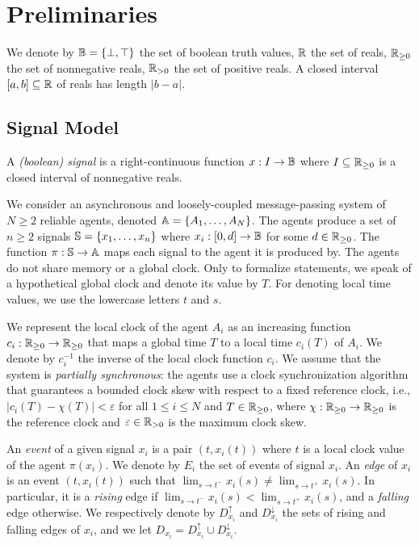 \section{Preliminaries}

We denote by $\B = \{ \bot, \top \}$ the set of boolean truth values, $\R$ the set of reals, $\R_{\geq 0}$ the set of nonnegative reals, $\R_{> 0}$ the set of positive reals.
A closed interval $[a,b] \subseteq \R$ of reals has length $|b-a|$.

\subsection{Signal Model}

\begin{definition}
	A \emph{(boolean) signal} is a right-continuous function $x : I \to \B$ where $I \subseteq \R_{\geq 0}$ is a closed interval of nonnegative reals.
\end{definition}

We consider an asynchronous and loosely-coupled message-passing system of $N \geq 2$ reliable agents, denoted $\A = \{A_1, \ldots, A_N\}$.
The agents produce a set of $n \geq 2$ signals $\S = \{x_1, \ldots, x_n\}$ where $x_i : [0,d] \to \B$ for some $d \in \R_{\geq 0}$. %
The function $\pi : \S \to \A$ maps each signal to the agent it is produced by.
The agents do not share memory or a global clock.
Only to formalize statements, we speak of a hypothetical global clock and denote its value by $T$.
For denoting local time values, we use the lowercase letters $t$ and $s$.

We represent the local clock of the agent $A_i$ as an increasing function $c_i : \R_{\geq 0} \to \R_{\geq 0}$ that maps a global time $T$ to a local time $c_i(T)$ of $A_i$.
We denote by $c_i^{-1}$ the inverse of the local clock function $c_i$.
We assume that the system is \emph{partially synchronous}: the agents use a clock synchronization algorithm that guarantees a bounded clock skew with respect to a fixed reference clock, i.e., $|c_i(T) - \chi(T)| < \varepsilon$ for all $1 \leq i \leq N$ and $T \in \R_{\geq 0}$, where $\chi : \R_{\geq 0} \to \R_{\geq 0}$ is the reference clock and $\varepsilon \in \R_{> 0}$ is the maximum clock skew. %

An \emph{event} of a given signal $x_i$ is a pair $(t, x_i(t))$ where $t$ is a local clock value of the agent $\pi(x_i)$.
We denote by $E_i$ the set of events of signal $x_i$.
An \emph{edge} of $x_i$ is an event $(t, x_i(t))$ such that $\lim_{s \to t^-} x_i(s) \neq \lim_{s \to t^+} x_i(s)$.
In particular, it is a \emph{rising} edge if $\lim_{s \to t^-} x_i(s) < \lim_{s \to t^+} x_i(s)$, and a \emph{falling} edge otherwise.
We respectively denote by $D_{x_i}^\uparrow$ and $D_{x_i}^\downarrow$ the sets of rising and falling edges of $x_i$, and we let $D_{x_i} = D_{x_i}^\uparrow \cup D_{x_i}^\downarrow$.

